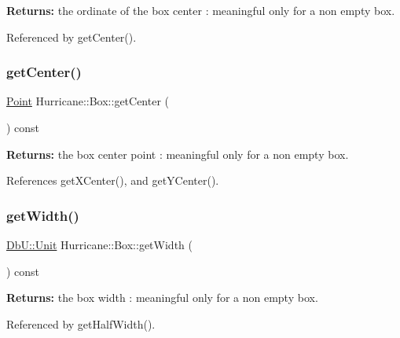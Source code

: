 {\bfseries Returns\+:} the ordinate of the box center \+: meaningful only for a non empty box. 

Referenced by get\+Center().

\mbox{\label{classHurricane_1_1Box_ac18c8725989166d1b101de29531e4f6e}} 
\subsubsection{\texorpdfstring{get\+Center()}{getCenter()}}
{\footnotesize\ttfamily \mbox{\hyperlink{classHurricane_1_1Point}{Point}} Hurricane\+::\+Box\+::get\+Center (\begin{DoxyParamCaption}{ }\end{DoxyParamCaption}) const\hspace{0.3cm}{\ttfamily [inline]}}

{\bfseries Returns\+:} the box center point \+: meaningful only for a non empty box. 

References get\+X\+Center(), and get\+Y\+Center().

\mbox{\label{classHurricane_1_1Box_ae2cc9cf0b17e6443a88b475bbd36e4c9}} 
\subsubsection{\texorpdfstring{get\+Width()}{getWidth()}}
{\footnotesize\ttfamily \mbox{\hyperlink{group__DbUGroup_ga4fbfa3e8c89347af76c9628ea06c4146}{Db\+U\+::\+Unit}} Hurricane\+::\+Box\+::get\+Width (\begin{DoxyParamCaption}{ }\end{DoxyParamCaption}) const\hspace{0.3cm}{\ttfamily [inline]}}

{\bfseries Returns\+:} the box width \+: meaningful only for a non empty box. 

Referenced by get\+Half\+Width().

\mbox{\label{classHurricane_1_1Box_a8aa689ad799e4c78bfefb0328e7d9081}} 
